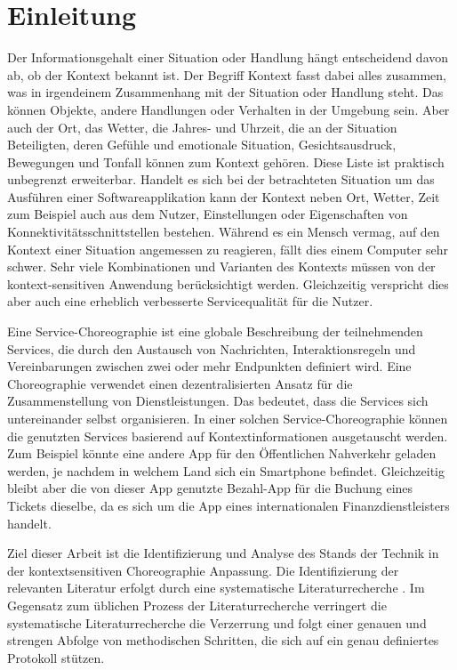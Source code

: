 \documentclass[conference,compsoc]{IEEEtran}
\begin{document}
\section{Einleitung}
Der Informationsgehalt einer Situation oder Handlung hängt entscheidend davon ab, ob der Kontext bekannt ist. Der Begriff Kontext fasst dabei alles zusammen, was in irgendeinem Zusammenhang mit der Situation oder Handlung steht. Das können Objekte, andere Handlungen oder Verhalten in der Umgebung sein. Aber auch der Ort, das Wetter, die Jahres- und Uhrzeit, die an der Situation Beteiligten, deren Gefühle und emotionale Situation, Gesichtsausdruck, Bewegungen und Tonfall können zum Kontext gehören. Diese Liste ist praktisch unbegrenzt erweiterbar. Handelt es sich bei der betrachteten Situation um das Ausführen einer Softwareapplikation kann der Kontext neben Ort, Wetter, Zeit zum Beispiel auch aus dem Nutzer, Einstellungen oder Eigenschaften von Konnektivitätsschnittstellen bestehen. Während es ein Mensch vermag, auf den Kontext einer Situation angemessen zu reagieren, fällt dies einem Computer sehr schwer. Sehr viele Kombinationen und Varianten des Kontexts müssen von der kontext-sensitiven Anwendung berücksichtigt werden. Gleichzeitig verspricht dies aber auch eine erheblich verbesserte Servicequalität für die Nutzer.

Eine Service-Choreographie ist eine globale Beschreibung der teilnehmenden Services, die durch den Austausch von Nachrichten, Interaktionsregeln und Vereinbarungen zwischen zwei oder mehr Endpunkten definiert wird. Eine Choreographie verwendet einen dezentralisierten Ansatz für die Zusammenstellung von Dienstleistungen. Das bedeutet, dass die Services sich untereinander selbst organisieren. In einer solchen Service-Choreographie können die genutzten Services basierend auf Kontextinformationen ausgetauscht werden. Zum Beispiel könnte eine andere App für den Öffentlichen Nahverkehr geladen werden, je nachdem in welchem Land sich ein Smartphone befindet. Gleichzeitig bleibt aber die von dieser App genutzte Bezahl-App für die Buchung eines Tickets dieselbe, da es sich um die App eines internationalen Finanzdienstleisters handelt.

Ziel dieser Arbeit ist die Identifizierung und Analyse des Stands der Technik in der kontextsensitiven Choreographie Anpassung. Die Identifizierung der relevanten Literatur erfolgt durch eine systematische Literaturrecherche \cite{budgen2006performing,kitchenham2009systematic}. Im Gegensatz zum üblichen Prozess der Literaturrecherche verringert die systematische Literaturrecherche die Verzerrung und folgt einer genauen und strengen Abfolge von methodischen Schritten, die sich auf ein genau definiertes Protokoll stützen.
\end{document}
